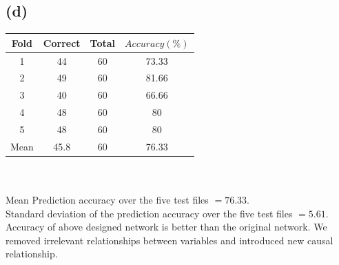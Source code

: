 \documentclass[11pt]{article} %
\begin{document}
\subsection*{(d)}
\begin{tabular}{|c|c|c|c|}\hline
Fold & Correct & Total & $Accuracy(\%)$  \\ \hline
1 & 44 & 60 & 73.33 \\ \hline
2 & 49 & 60 & 81.66 \\ \hline
3 & 40 & 60 & 66.66 \\ \hline
4 & 48 & 60 & 80 \\ \hline
5 & 48 & 60 & 80 \\ \hline
Mean & 45.8 & 60 & 76.33 \\\hline
\end{tabular}
\\ \\
Mean Prediction accuracy over the five test files $=76.33$. \\
Standard deviation of the prediction accuracy over the five test files $=5.61$. \\
Accuracy of above designed network is better than the original network. We removed irrelevant relationships between variables and introduced new causal relationship. \\
\end{document}
